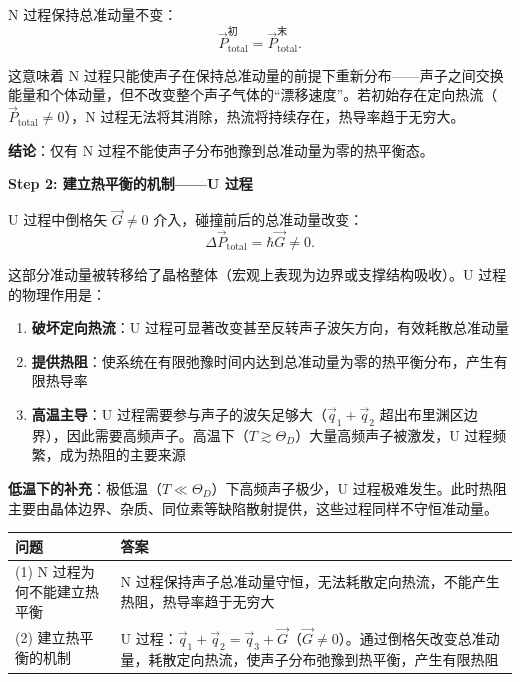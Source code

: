 \begin{derivationbox}[标准解题过程]
N 过程保持总准动量不变：
\begin{equation}
\vec P_{\text{total}}^{\text{初}}=\vec P_{\text{total}}^{\text{末}}.
\end{equation}

这意味着 N 过程只能使声子在保持总准动量的前提下重新分布——声子之间交换能量和个体动量，但不改变整个声子气体的``漂移速度''。若初始存在定向热流（$\vec P_{\text{total}}\neq0$），N 过程无法将其消除，热流将持续存在，热导率趋于无穷大。

\textbf{结论}：仅有 N 过程不能使声子分布弛豫到总准动量为零的热平衡态。

\textbf{Step 2: 建立热平衡的机制——U 过程}

U 过程中倒格矢 $\vec G\neq0$ 介入，碰撞前后的总准动量改变：
\begin{equation}
\Delta\vec P_{\text{total}}=\hbar\vec G\neq0.
\end{equation}

这部分准动量被转移给了晶格整体（宏观上表现为边界或支撑结构吸收）。U 过程的物理作用是：

\begin{enumerate}
    \item \textbf{破坏定向热流}：U 过程可显著改变甚至反转声子波矢方向，有效耗散总准动量
    \item \textbf{提供热阻}：使系统在有限弛豫时间内达到总准动量为零的热平衡分布，产生有限热导率
    \item \textbf{高温主导}：U 过程需要参与声子的波矢足够大（$\vec q_1+\vec q_2$ 超出布里渊区边界），因此需要高频声子。高温下（$T\gtrsim\Theta_D$）大量高频声子被激发，U 过程频繁，成为热阻的主要来源
\end{enumerate}

\textbf{低温下的补充}：极低温（$T\ll\Theta_D$）下高频声子极少，U 过程极难发生。此时热阻主要由晶体边界、杂质、同位素等缺陷散射提供，这些过程同样不守恒准动量。
\end{derivationbox}

\begin{formulabox}[答案汇总]
\begin{center}
\begin{tabular}{p{3.5cm}p{8cm}}
\toprule
问题 & 答案 \\
\midrule
(1) N 过程为何不能建立热平衡 & N 过程保持声子总准动量守恒，无法耗散定向热流，不能产生热阻，热导率趋于无穷大 \\
\addlinespace
(2) 建立热平衡的机制 & U 过程：$\vec q_1+\vec q_2=\vec q_3+\vec G$（$\vec G\neq0$）。通过倒格矢改变总准动量，耗散定向热流，使声子分布弛豫到热平衡，产生有限热阻 \\
\bottomrule
\end{tabular}
\end{center}
\end{formulabox}

